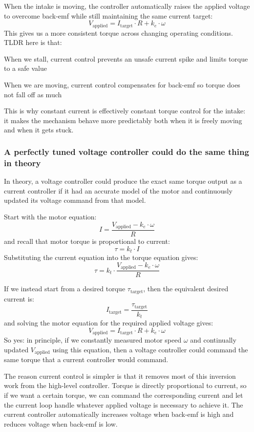 \documentclass[12pt]{article}
\begin{document}
\par When the intake is moving, the controller automatically raises the applied voltage to overcome back-emf while still maintaining the same current target:
\[
V_{\text{applied}} = I_{\text{target}} \cdot R + k_e \cdot \omega
\]
This gives us a more consistent torque across changing operating conditions. TLDR here is that:
\par When we stall, current control prevents an unsafe current spike and limits torque to a safe value
\par When we are moving, current control compensates for back-emf so torque does not fall off as much

\par This is why constant current is effectively constant torque control for the intake: it makes the mechanism behave more predictably both when it is freely moving and when it gets stuck.

\subsubsection{A perfectly tuned voltage controller could do the same thing in theory}
In theory, a voltage controller could produce the exact same torque output as a current controller if it had an accurate model of the motor and continuously updated its voltage command from that model.

\par Start with the motor equation:
\[
I = \frac{V_{\text{applied}} - k_e \cdot \omega}{R}
\]
and recall that motor torque is proportional to current:
\[
\tau = k_t \cdot I
\]
Substituting the current equation into the torque equation gives:
\[
\tau = k_t \cdot \frac{V_{\text{applied}} - k_e \cdot \omega}{R}
\]

\par If we instead start from a desired torque $\tau_{\text{target}}$, then the equivalent desired current is:
\[
I_{\text{target}} = \frac{\tau_{\text{target}}}{k_t}
\]
and solving the motor equation for the required applied voltage gives:
\[
V_{\text{applied}} = I_{\text{target}} \cdot R + k_e \cdot \omega
\]
So yes: in principle, if we constantly measured motor speed $\omega$ and continually updated $V_{\text{applied}}$ using this equation, then a voltage controller could command the same torque that a current controller would command.

\par The reason current control is simpler is that it removes most of this inversion work from the high-level controller. Torque is directly proportional to current, so if we want a certain torque, we can command the corresponding current and let the current loop handle whatever applied voltage is necessary to achieve it. The current controller automatically increases voltage when back-emf is high and reduces voltage when back-emf is low.
\end{document}
